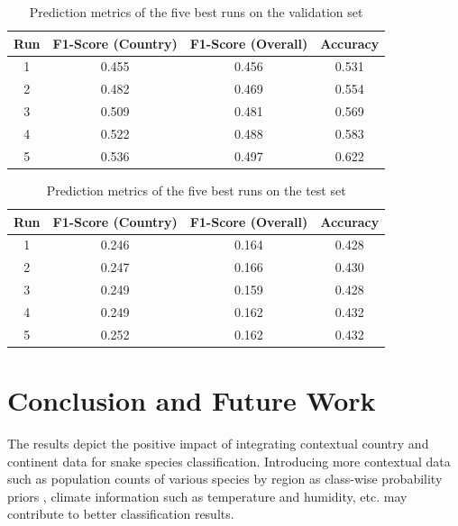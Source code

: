 \documentclass[
]{ceurart}
\begin{document}
\begin{center}
    \begin{table}[!hbt]
        \caption{Prediction metrics of the five best runs on the validation set}
        \begin{tabular}{|c|c|c|c|}
            \toprule
             Run & F1-Score (Country) & F1-Score (Overall) & Accuracy \\
             \midrule  
             1 & 0.455 & 0.456 & 0.531 \\ 
             2 & 0.482 & 0.469 & 0.554 \\  
             3 & 0.509 & 0.481 & 0.569 \\   
             4 & 0.522 & 0.488 & 0.583 \\ 
             5 & 0.536 & 0.497 & 0.622 \\
             \bottomrule
        \end{tabular}
        \label{performance_table_val}
    \end{table}
\end{center}

\begin{center}
    \begin{table}[!hbt]
        \caption{Prediction metrics of the five best runs on the test set}
        \begin{tabular}{|c|c|c|c|}
            \toprule
             Run & F1-Score (Country) & F1-Score (Overall) & Accuracy \\
             \midrule
             1 & 0.246 & 0.164 & 0.428 \\
             2 & 0.247 & 0.166 & 0.430 \\  
             3 & 0.249 & 0.159 & 0.428 \\   
             4 & 0.249 & 0.162 & 0.432 \\ 
             5 & 0.252 & 0.162 & 0.432 \\
             \bottomrule
        \end{tabular}
        \label{performance_table_test}
    \end{table}
\end{center}

\section{Conclusion and Future Work}

The results depict the positive impact of integrating contextual country and continent data for snake species classification. Introducing more contextual data such as population counts of various species by region as class-wise probability priors \cite{wang}, climate information such as temperature and humidity, etc. may contribute to better classification results. 
\end{document}
